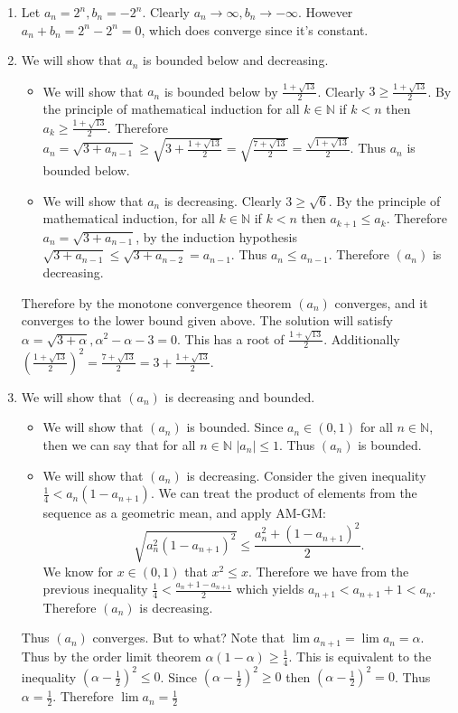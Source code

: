 \documentclass[12pt, letterpaper]{article}
\newcommand{\N}{\mathbb{N}}
\begin{document}
\begin{enumerate}
	\item Let $a_n = 2^n, b_n = -2^n$.  Clearly $a_n \to \infty, b_n \to -\infty$.
	However $a_n + b_n = 2^n - 2^n = 0$, which does converge since it's constant.
	\item We will show that $a_n$ is bounded below and decreasing.
	\begin{itemize}
		\item We will show that $a_n$ is bounded below by $\frac{1 + \sqrt{13}}{2}$.  Clearly $3 \geq \frac{1 + \sqrt{13}}{2}$.  By the principle of mathematical induction for all $k \in \N$ if $k < n$ then $a_k \geq \frac{1+\sqrt{13}}{2}$.
		Therefore $a_{n} = \sqrt{3 + a_{n-1}} \geq \sqrt{3 + \frac{1+\sqrt{13}}{2}} = \sqrt{\frac{7+\sqrt{13}}{2}} = \frac{\sqrt{1+\sqrt{13}}}{2}$.  Thus $a_n$ is bounded below.  
		\item We will show that $a_n$ is decreasing.  Clearly $3 \geq \sqrt{6}$.  
		By the principle of mathematical induction, for all $k \in \N$ if $k < n$ then $a_{k+1} \leq a_k$.  Therefore $a_n = \sqrt{3 + a_{n-1}}$, by the induction 
		hypothesis $\sqrt{3 + a_{n-1}} \leq \sqrt{3 + a_{n-2}} = a_{n-1}$.  
		Thus $a_n \leq a_{n-1}$.  Therefore $(a_n)$ is decreasing.
	\end{itemize}
	Therefore by the monotone convergence theorem $(a_n)$ converges, and it converges to the lower bound given above.  The solution will satisfy 
	$\alpha = \sqrt{3 + \alpha}, \alpha^2 - \alpha - 3 =0$.  This has a root of $\frac{1+ \sqrt{13}}{2}$.  Additionally $\left(\frac{1+\sqrt{13}}{2}\right)^2 = \frac{7+\sqrt{13}}{2} = 3 + \frac{1+\sqrt{13}}{2}$.  
	\item We will show that $(a_n)$ is decreasing and bounded.
	\begin{itemize}
		\item We will show that $(a_n)$ is bounded.  Since $a_n \in (0,1)$ for all $n \in \N$, then we can say that for all $n \in \N$ $|a_n| \leq 1$.  
		Thus $(a_n)$ is bounded.
		\item We will show that $(a_n)$ is decreasing.  Consider the given inequality $\frac{1}{4} < a_n(1-a_{n+1})$.  We can treat the product of 
		elements from the sequence as a geometric mean, and apply AM-GM:
		$$
		\sqrt{a_n^2 (1-a_{n+1})^2} \leq \frac{a_n^2 + (1-a_{n+1})^2}{2}.
		$$ 
		We know for $x \in (0,1)$ that $x^2 \leq x$.  Therefore 
		we have from the previous inequality $\frac{1}{4} < \frac{a_n + 1 - a_{n+1}}{2}$ which yields $a_{n+1} < a_{n+1} + 1 < a_n$.  Therefore $(a_n)$ is decreasing.
	\end{itemize}
	Thus $(a_n)$ converges.  But to what?  Note that $\lim a_{n+1} = \lim a_n = \alpha$.  Thus by the order limit theorem $\alpha(1-\alpha) \geq \frac{1}{4}$.  This is equivalent to the inequality $(\alpha - \frac{1}{2})^2 \leq 0$.  Since $(\alpha - \frac{1}{2})^2 \geq 0$ then $(\alpha - \frac{1}{2})^2 = 0$.  Thus $\alpha = \frac{1}{2}$.  Therefore $\lim a_n = \frac{1}{2}$

\end{enumerate}
\end{document}
